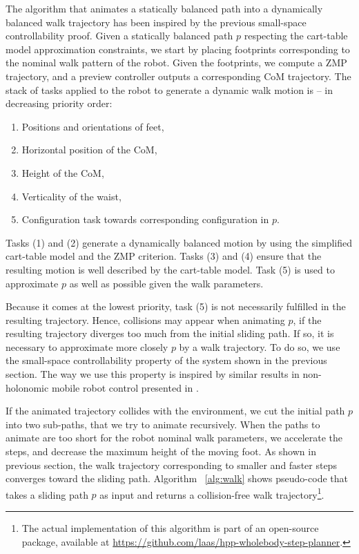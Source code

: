 \documentclass{article}
\begin{document}
The  algorithm   that  animates  a  statically  balanced   path  into  a
dynamically balanced  walk trajectory has been inspired  by the previous
small-space controllability  proof.
Given a statically  balanced path $p$ respecting the cart-table model approximation constraints,
we  start  by placing  footprints  corresponding  to  the nominal  walk
pattern  of the  robot. Given the footprints, we  compute a ZMP trajectory, 
and a preview controller outputs  a corresponding CoM trajectory. 
The stack of tasks applied to
the robot to generate a dynamic walk motion is -- in decreasing priority order:

\begin{enumerate}

\item Positions and orientations of  feet,

\item Horizontal position of the CoM,

\item Height of the CoM,

\item Verticality of the waist,

\item Configuration task towards corresponding
  configuration  in $p$.

\end{enumerate}

Tasks (1)  and (2) generate a  dynamically balanced motion  by using the
simplified cart-table model  and the ZMP criterion. Tasks  (3) and (4)
ensure that the  resulting motion is well described  by the cart-table
model. Task (5)  is used to approximate $p$ as  well as possible given
the walk parameters.

Because it comes at the  lowest priority, task (5) is not necessarily
fulfilled in  the resulting trajectory. Hence,  collisions may appear
when animating $p$, if the resulting trajectory diverges too much from
the initial sliding  path. If so, it is  necessary to approximate more
closely $p$  by a walk  trajectory.  To do  so, we use  the small-space
controllability  property   of  the  system  shown   in  the  previous
section. The way  we use this property is  inspired by similar results
in non-holonomic mobile robot control presented in \cite{taix-94}.

If the animated  trajectory collides with the environment,  we cut the
initial  path   $p$  into  two   sub-paths,  that  we  try   to  animate
recursively. When the  paths to animate are too  short for the robot
nominal  walk parameters, we  accelerate the  steps, and  decrease the
maximum height of  the moving foot. As shown  in previous section, the
walk trajectory  corresponding to  smaller and faster  steps converges
toward the  sliding path.  Algorithm ~\ref{alg:walk} shows pseudo-code
that takes  a sliding path $p$  as input and  returns a collision-free
walk trajectory\footnote{The actual implementation of this algorithm is
part of an open-source package, available at
\url{https://github.com/laas/hpp-wholebody-step-planner}.}.
\end{document}
